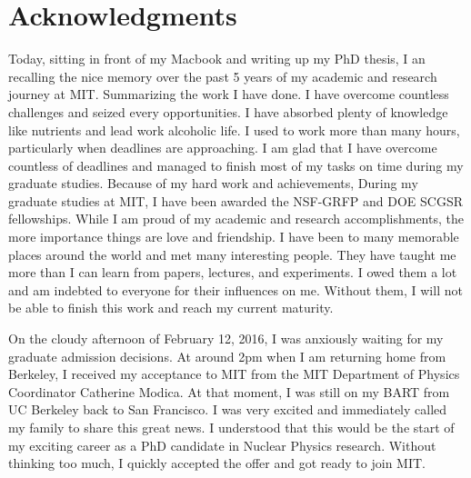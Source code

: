 \cleardoublepage
\setcounter{savepage}{\thepage}
\begin{abstractpage}

\end{abstractpage}

% 

\cleardoublepage

\section*{Acknowledgments}


Today, sitting in front of my Macbook and writing up my PhD thesis, I an recalling the nice memory over the past 5 years of my academic and research journey at MIT. Summarizing the work I have done. I have overcome countless challenges and seized every opportunities. I have absorbed plenty of knowledge like nutrients and lead work alcoholic life. I used to work more than many hours, particularly when deadlines are approaching. I am glad that I have overcome countless of deadlines and managed to finish most of my tasks on time during my graduate studies. Because of my hard work and achievements, During my graduate studies at MIT, I have been awarded the NSF-GRFP and DOE SCGSR fellowships. While I am proud of my academic and research accomplishments, the more importance things are love and friendship. I have been to many memorable places around the world and met many interesting people. They have taught me more than I can learn from papers, lectures, and experiments. I owed them a lot and am indebted to everyone for their influences on me. Without them, I will not be able to finish this work and reach my current maturity.

On the cloudy afternoon of February 12, 2016, I was anxiously waiting for my graduate admission decisions. At around 2pm when I am returning home from Berkeley, I received my acceptance to MIT from the MIT Department of Physics Coordinator Catherine Modica. At that moment, I was still on my BART from UC Berkeley back to San Francisco. I was very excited and immediately called my family to share this great news. I understood that this would be the start of my exciting career as a PhD candidate in Nuclear Physics research. Without thinking too much, I quickly accepted the offer and got ready to join MIT.

